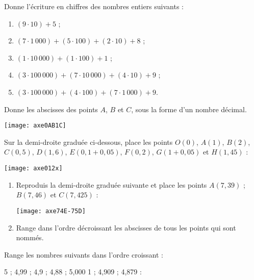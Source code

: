 \begin{exercice}
Donne l'écriture en chiffres des nombres entiers suivants :
\begin{enumerate}
 \item $(9 \cdot 10) + 5$ ;
 \item $(7 \cdot 1\,000) + (5 \cdot 100) + (2 \cdot 10) + 8$ ;
 \item $(1 \cdot 10\,000) + (1 \cdot 100) + 1$ ;
 \item  $(3 \cdot 100\,000) + (7 \cdot 10\,000) + (4 \cdot 10) + 9$ ;
 \item  $(3 \cdot 100\,000) + (4 \cdot 100) + (7 \cdot 1\,000) + 9$.
 \end{enumerate}
\end{exercice}


\begin{exercice}
Donne les abscisses des points $A$, $B$ et $C$, sous la forme d'un nombre décimal.
\begin{center} \texttt{[image: axe0AB1C]} \end{center}
\end{exercice}


\begin{exercice}
Sur la demi-droite graduée ci-dessous, place les points $O(0)$, $A(1)$, $B(2)$, $C(0,5)$, $D(1,6)$, $E(0,1 + 0,05)$, $F(0,2)$, $G(1 + 0,05)$ et $H(1,45)$ :
\begin{center} \texttt{[image: axe012x]} \end{center}
\end{exercice}



\begin{exercice}
\begin{enumerate}
 \item Reproduis la demi-droite graduée suivante et place les points $A(7,39)$ ; $B(7,46)$ et $C(7,425)$ :
\begin{center} \texttt{[image: axe74E-75D]} \end{center}
 \item Range dans l'ordre décroissant les abscisses de tous les points qui sont nommés.
 \end{enumerate}
\end{exercice}

\begin{exercice}[Rangement]
Range les nombres suivants dans l'ordre croissant :

5 ; 4,99 ; 4,9 ; 4,88 ; 5,000 1 ; 4,909 ; 4,879 :

\dotfill

\dotfill
\end{exercice}


